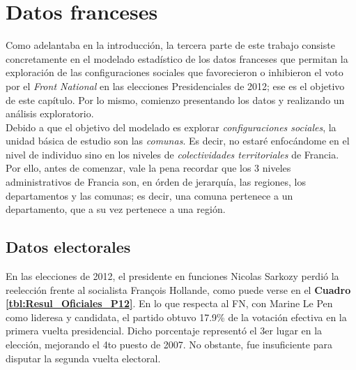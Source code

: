 \chapter{Datos franceses}

Como adelantaba en la introducción, la tercera parte de este trabajo consiste concretamente en el modelado estadístico de los datos franceses que permitan la exploración de las configuraciones sociales que favorecieron o inhibieron el voto por el \textit{Front National} en las elecciones Presidenciales de 2012; ese es el objetivo de este capítulo. Por lo mismo, comienzo presentando los datos y realizando un análisis exploratorio.\\

Debido a que el objetivo del modelado es explorar \textit{configuraciones sociales}, la unidad básica de estudio son las \textit{comunas}. Es decir, no estaré enfocándome en el nivel de individuo sino en los niveles de \textit{colectividades territoriales} de Francia. Por ello, antes de comenzar, vale la pena recordar que los 3 niveles administrativos de Francia son, en órden de jerarquía, las regiones, los departamentos y las comunas; es decir, una comuna pertenece a un departamento, que a su vez pertenece a una región. 

\section{Datos electorales}

En las elecciones de 2012, el presidente en funciones Nicolas Sarkozy perdió la reelección frente al socialista François Hollande, como puede verse en el \textbf{Cuadro \ref{tbl:Resul_Oficiales_P12}}. En lo que respecta al FN, con Marine Le Pen como lideresa y candidata, el partido obtuvo 17.9\% de la votación efectiva en la primera vuelta presidencial. Dicho porcentaje representó el 3er lugar en la elección, mejorando el 4to puesto de 2007. No obstante, fue insuficiente para disputar la segunda vuelta electoral.\\

